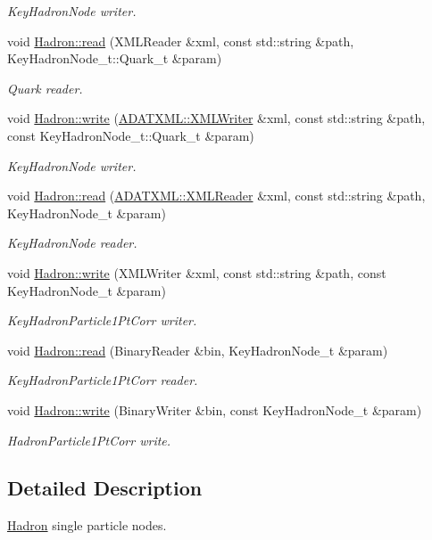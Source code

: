 \begin{DoxyCompactItemize}
\begin{DoxyCompactList}\small\item\em Key\+Hadron\+Node writer. \end{DoxyCompactList}\item 
void \mbox{\hyperlink{namespaceHadron_a6eef93fdb3fe356c6326b6e8e0757ccb}{Hadron\+::read}} (X\+M\+L\+Reader \&xml, const std\+::string \&path, Key\+Hadron\+Node\+\_\+t\+::\+Quark\+\_\+t \&param)
\begin{DoxyCompactList}\small\item\em Quark reader. \end{DoxyCompactList}\item 
void \mbox{\hyperlink{namespaceHadron_aa7f9575393c93afa7db5f164da5c31eb}{Hadron\+::write}} (\mbox{\hyperlink{classADATXML_1_1XMLWriter}{A\+D\+A\+T\+X\+M\+L\+::\+X\+M\+L\+Writer}} \&xml, const std\+::string \&path, const Key\+Hadron\+Node\+\_\+t\+::\+Quark\+\_\+t \&param)
\begin{DoxyCompactList}\small\item\em Key\+Hadron\+Node writer. \end{DoxyCompactList}\item 
void \mbox{\hyperlink{namespaceHadron_acbb0293cc9773c6009050757b471c4d8}{Hadron\+::read}} (\mbox{\hyperlink{classADATXML_1_1XMLReader}{A\+D\+A\+T\+X\+M\+L\+::\+X\+M\+L\+Reader}} \&xml, const std\+::string \&path, Key\+Hadron\+Node\+\_\+t \&param)
\begin{DoxyCompactList}\small\item\em Key\+Hadron\+Node reader. \end{DoxyCompactList}\item 
void \mbox{\hyperlink{namespaceHadron_ab67658d0abad845f6efa3ba94de7692c}{Hadron\+::write}} (X\+M\+L\+Writer \&xml, const std\+::string \&path, const Key\+Hadron\+Node\+\_\+t \&param)
\begin{DoxyCompactList}\small\item\em Key\+Hadron\+Particle1\+Pt\+Corr writer. \end{DoxyCompactList}\item 
void \mbox{\hyperlink{namespaceHadron_ac376de4f56715288fc1a3eb4e0cc6725}{Hadron\+::read}} (Binary\+Reader \&bin, Key\+Hadron\+Node\+\_\+t \&param)
\begin{DoxyCompactList}\small\item\em Key\+Hadron\+Particle1\+Pt\+Corr reader. \end{DoxyCompactList}\item 
void \mbox{\hyperlink{namespaceHadron_a33192b7d206ee95549b4605c3db6cde8}{Hadron\+::write}} (Binary\+Writer \&bin, const Key\+Hadron\+Node\+\_\+t \&param)
\begin{DoxyCompactList}\small\item\em Hadron\+Particle1\+Pt\+Corr write. \end{DoxyCompactList}\end{DoxyCompactItemize}


\subsection{Detailed Description}
\mbox{\hyperlink{namespaceHadron}{Hadron}} single particle nodes. 

